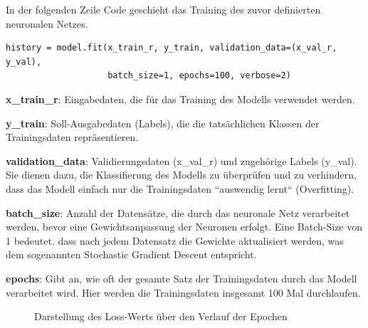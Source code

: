 In der folgenden Zeile Code geschieht das Training des zuvor definierten neuronalen Netzes.

\begin{verbatim}
history = model.fit(x_train_r, y_train, validation_data=(x_val_r, y_val),
                    batch_size=1, epochs=100, verbose=2)
\end{verbatim}

\begin{mdframed}

\textbf{x\_train\_r}: Eingabedaten, die für das Training des Modells verwendet werden.

\textbf{y\_train}: Soll-Ausgabedaten (Labels), die die tatsächlichen Klassen der Trainingsdaten repräsentieren.

\textbf{validation\_data}: Validierungsdaten (x\_val\_r) und zugehörige Labels (y\_val). Sie dienen dazu, die Klassifierung des Modells zu überprüfen und zu verhindern, dass das Modell einfach nur die Trainingsdaten ``auswendig lernt`` (Overfitting).

\textbf{batch\_size}: Anzahl der Datensätze, die durch das neuronale Netz verarbeitet werden, bevor eine Gewichtsanpassung der Neuronen erfolgt. Eine Batch-Size von 1 bedeutet, dass nach jedem Datensatz die Gewichte aktualisiert werden, was dem sogenannten Stochastic Gradient Descent entspricht.

\textbf{epochs}: Gibt an, wie oft der gesamte Satz der Trainingsdaten durch das Modell verarbeitet wird. Hier werden die Trainingsdaten insgesamt 100 Mal durchlaufen.

\end{mdframed}

\begin{figure} %
	\vspace{-20pt + 0.02\textwidth}
	\caption{Darstellung des Loss-Werts über den Verlauf der Epochen}
	\label{fig:img-training-graph}
\end{figure}

